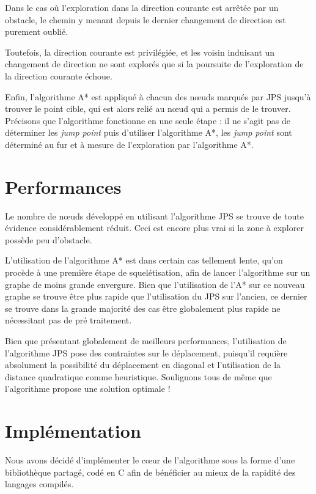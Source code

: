 \documentclass[a4paper,11pt]{article}
\begin{document}
\begin{description}
Dans le cas où l'exploration dans la direction courante est arrêtée par un
obstacle, le chemin y menant depuis le dernier 
changement de direction est purement oublié.

Toutefois, la direction courante est privilégiée, et les voisin induisant un
changement de direction ne sont explorés que si
la poursuite de l'exploration de la direction courante échoue.
\end{description}

Enfin, l'algorithme A* est appliqué à chacun des nœuds marqués par JPS jusqu'à
trouver le point cible, qui est alors relié au 
nœud qui a permis de le trouver. Précisons que l’algorithme fonctionne en une
seule étape : il ne s’agit pas de déterminer les \emph{jump point} puis
d’utiliser l'algorithme A*, les \emph{jump point} sont déterminé au fur et à
mesure de l’exploration par l'algorithme A*.

\section{Performances}
Le nombre de nœuds développé en utilisant l'algorithme JPS se trouve
de toute évidence considérablement réduit. Ceci est encore plus vrai si la zone
à explorer possède peu d’obstacle.

L’utilisation de l’algorithme A* est dans certain cas tellement lente, qu’on
procède à une première étape de squelétisation, afin de lancer l’algorithme sur
un graphe de moins grande envergure. Bien que l’utilisation de l’A* sur ce
nouveau graphe se trouve être plus rapide que l’utilisation du JPS sur
l’ancien, ce dernier se trouve dans la grande majorité des cas être globalement
plus rapide ne nécessitant pas de pré traitement.

Bien que présentant globalement de meilleurs performances, l'utilisation de
l'algorithme JPS pose des contraintes sur le déplacement, puisqu'il requière
absolument la possibilité du déplacement en diagonal et l'utilisation de la
distance quadratique comme heuristique. Soulignons tous de même
que l'algorithme propose une solution optimale !

\section{Implémentation}
Nous avons décidé d'implémenter le cœur de l'algorithme sous la forme d’une
bibliothèque partagé, codé en C afin de bénéficier
au mieux de la rapidité des langages compilés.
\end{document}
